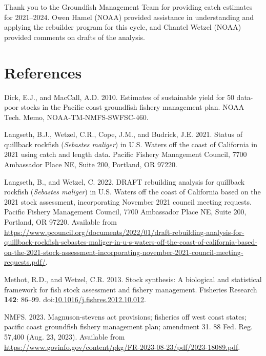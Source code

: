 \documentclass[11pt,
  letterpaper,
]{article}
\newlength{\cslhangindent}
\newenvironment{CSLReferences}[2] %
 {%
  \setlength{\parindent}{0pt}
  \ifodd #1 \everypar{\setlength{\hangindent}{\cslhangindent}}\ignorespaces\fi
  \ifnum #2 > 0
  \setlength{\parskip}{#2\baselineskip}
  \fi
 }%
 {}
\begin{document}
Thank you to the Groundfish Management Team for providing catch estimates for 2021--2024. Owen Hamel (NOAA) provided assistance in understanding and applying the rebuilder program for this cycle, and Chantel Wetzel (NOAA) provided comments on drafts of the analysis.

\clearpage

\hypertarget{references}{%
\section{References}\label{references}}

\hypertarget{refs}{}
\begin{CSLReferences}{1}{0}
\leavevmode{}%
Dick, E.J., and MacCall, A.D. 2010. Estimates of sustainable yield for 50 data-poor stocks in the {P}acific coast groundfish fishery management plan. NOAA Tech. Memo, NOAA-TM-NMFS-SWFSC-460.

\leavevmode{}%
Langseth, B.J., Wetzel, C.R., Cope, J.M., and Budrick, J.E. 2021. Status of quillback rockfish (\emph{{Sebastes} maliger}) in {U}.{S}. Waters off the coast of {C}alifornia in 2021 using catch and length data. Pacific Fishery Management Council, 7700 Ambassador Place NE, Suite 200, Portland, OR 97220.

\leavevmode{}%
Langseth, B., and Wetzel, C. 2022. DRAFT rebuilding analysis for quillback rockfish (\emph{{S}ebastes maliger}) in {U}.{S}. Waters off the coast of {C}alifornia based on the 2021 stock assessment, incorporating {N}ovember 2021 council meeting requests. Pacific Fishery Management Council, 7700 Ambassador Place NE, Suite 200, Portland, OR 97220. Available from \url{https://www.pcouncil.org/documents/2022/01/draft-rebuilding-analysis-for-quillback-rockfish-sebastes-maliger-in-u-s-waters-off-the-coast-of-california-based-on-the-2021-stock-assessment-incorporating-november-2021-council-meeting-requests.pdf/}.

\leavevmode{}%
Methot, R.D., and Wetzel, C.R. 2013. Stock synthesis: A biological and statistical framework for fish stock assessment and fishery management. Fisheries Research \textbf{142}: 86--99. doi:\href{https://doi.org/10.1016/j.fishres.2012.10.012}{10.1016/j.fishres.2012.10.012}.

\leavevmode{}%
NMFS. 2023. Magnuson-stevens act provisions; fisheries off west coast states; pacific coast groundfish fishery management plan; amendment 31. 88 Fed. Reg. 57,400 (Aug. 23, 2023). Available from \url{https://www.govinfo.gov/content/pkg/FR-2023-08-23/pdf/2023-18089.pdf}.


\end{CSLReferences}
\end{document}
